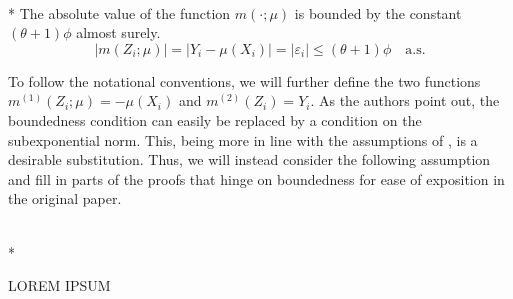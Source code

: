 \begin{boxD}
	\begin{asm}\mbox{}\\*
		The absolute value of the function $m(\cdot; \mu)$ is bounded by the constant $(\theta+1) \phi$ almost surely.
		\begin{equation}
			|m(Z_{i} ; \mu)|
			= |Y_{i} - \mu(X_{i})|
			= |\varepsilon_i|
			\leq (\theta+1) \phi
			\quad \text{a.s.}
		\end{equation}
	\end{asm}
\end{boxD}
To follow the notational conventions, we will further define the two functions $m^{(1)}(Z_{i}; \mu) = - \mu(X_{i})$ and $m^{(2)}(Z_{i}) = Y_{i}$.
As the authors point out, the boundedness condition can easily be replaced by a condition on the subexponential norm.
This, being more in line with the assumptions of \citet{demirkaya_optimal_2024}, is a desirable substitution.
Thus, we will instead consider the following assumption and fill in parts of the proofs that hinge on boundedness for ease of exposition in the original paper.

\begin{boxD}
	\begin{asm}\mbox{}\\*

	\end{asm}	
\end{boxD}


{\color{red} LOREM IPSUM}

% 



